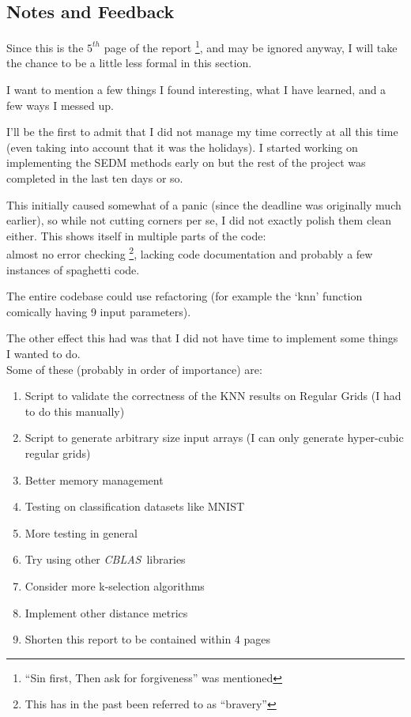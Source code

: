 \documentclass[10pt, a4paper]{article}
\newcommand{\blas}{\textit{CBLAS}}
\begin{document}
\subsection{Notes and Feedback}
Since this is the $5^{th}$ page of the report \footnote{``Sin first, Then ask for forgiveness'' was mentioned},
and may be ignored anyway, I will take the chance to be a little less formal in this section.

I want to mention a few things I found interesting, what I have learned, and a few ways I messed up.

I'll be the first to admit that I did not manage my time correctly at all this time
(even taking into account that it was the holidays).
I started working on implementing the SEDM methods early on but the rest of the
project was completed in the last ten days or so.

This initially caused somewhat of a panic (since the deadline was originally much earlier),
so while not cutting corners per se, I did not exactly polish them clean either. 
This shows itself in multiple parts of the code: \\
almost no error checking \footnote{This has in the past been referred to as ``bravery''}, 
lacking code documentation and probably a few instances of spaghetti code. 

The entire codebase could use refactoring
(for example the `knn' function comically having 9 input parameters).

The other effect this had was that I did not have time to implement some things I wanted to do.\\
Some of these (probably in order of importance) are:
\begin{enumerate}
	\item Script to validate the correctness of the KNN results on Regular Grids (I had to do this manually)
	\item Script to generate arbitrary size input arrays (I can only generate hyper-cubic regular grids)
	\item Better memory management
	\item Testing on classification datasets like MNIST
	\item More testing in general
	\item Try using other \blas \ libraries
	\item Consider more k-selection algorithms
	\item Implement other distance metrics
	\item Shorten this report to be contained within 4 pages 
\end{enumerate}
\end{document}
